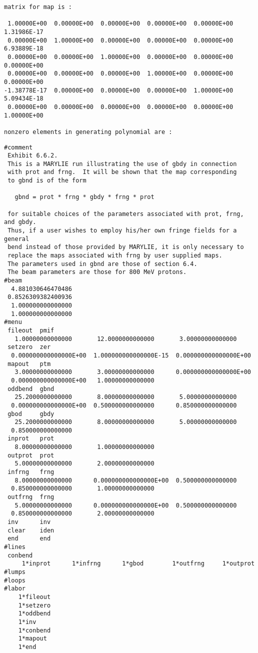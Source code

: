 \begin{footnotesize}
\begin{verbatim}
matrix for map is :

 1.00000E+00  0.00000E+00  0.00000E+00  0.00000E+00  0.00000E+00  1.31986E-17
 0.00000E+00  1.00000E+00  0.00000E+00  0.00000E+00  0.00000E+00  6.93889E-18
 0.00000E+00  0.00000E+00  1.00000E+00  0.00000E+00  0.00000E+00  0.00000E+00
 0.00000E+00  0.00000E+00  0.00000E+00  1.00000E+00  0.00000E+00  0.00000E+00
-1.38778E-17  0.00000E+00  0.00000E+00  0.00000E+00  1.00000E+00  5.09434E-18
 0.00000E+00  0.00000E+00  0.00000E+00  0.00000E+00  0.00000E+00  1.00000E+00

nonzero elements in generating polynomial are :

\end{verbatim}
\end{footnotesize}

\newpage
\begin{footnotesize}
\begin{verbatim}
#comment
 Exhibit 6.6.2.
 This is a MARYLIE run illustrating the use of gbdy in connection
 with prot and frng.  It will be shown that the map corresponding
 to gbnd is of the form

   gbnd = prot * frng * gbdy * frng * prot

 for suitable choices of the parameters associated with prot, frng, and gbdy.
 Thus, if a user wishes to employ his/her own fringe fields for a general
 bend instead of those provided by MARYLIE, it is only necessary to
 replace the maps associated with frng by user supplied maps.
 The parameters used in gbnd are those of section 6.4.
 The beam parameters are those for 800 MeV protons.
#beam
  4.881030646470486
 0.8526309382400936
  1.000000000000000
  1.000000000000000
#menu
 fileout  pmif
   1.00000000000000       12.0000000000000       3.00000000000000
 setzero  zer
  0.000000000000000E+00  1.000000000000000E-15  0.000000000000000E+00
 mapout   ptm
   3.00000000000000       3.00000000000000      0.000000000000000E+00
  0.000000000000000E+00   1.00000000000000
 oddbend  gbnd
   25.2000000000000       8.00000000000000       5.00000000000000
  0.000000000000000E+00  0.500000000000000      0.850000000000000
 gbod     gbdy
   25.2000000000000       8.00000000000000       5.00000000000000
  0.850000000000000
 inprot   prot
   8.00000000000000       1.00000000000000
 outprot  prot
   5.00000000000000       2.00000000000000
 infrng   frng
   8.00000000000000      0.000000000000000E+00  0.500000000000000
  0.850000000000000       1.00000000000000
 outfrng  frng
   5.00000000000000      0.000000000000000E+00  0.500000000000000
  0.850000000000000       2.00000000000000
 inv      inv
 clear    iden
 end      end
#lines
 conbend
     1*inprot      1*infrng      1*gbod        1*outfrng     1*outprot
#lumps
#loops
#labor
    1*fileout
    1*setzero
    1*oddbend
    1*inv
    1*conbend
    1*mapout
    1*end


\end{verbatim}
\end{footnotesize}
